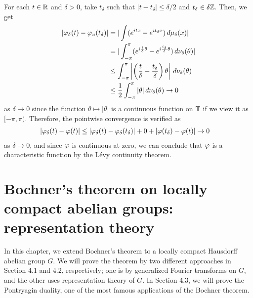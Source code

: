 \documentclass{../../small}
\begin{document}
\begin{pf}
For each $t\in\mathbb{R}$ and $\delta>0$, take $t_\delta$ such that $|t-t_\delta|\le\delta/2$ and $t_\delta\in\delta\mathbb{Z}$.
Then, we get
\begin{align*}
|\varphi_\delta(t)-\varphi_u(t_\delta)|
&=|\int(e^{itx}-e^{it_\delta x})\,d\mu_\delta(x)|\\
&=|\int_{-\pi}^\pi(e^{i\frac t\delta\theta}-e^{i\frac{t_\delta}\delta\theta})\,d\nu_\delta(\theta)|\\
&\le\int_{-\pi}^\pi\left|\left(\frac t\delta-\frac{t_\delta}\delta\right)\theta\right|\,d\nu_\delta(\theta)\\
&\le\frac12\int_{-\pi}^\pi|\theta|\,d\nu_\delta(\theta)\to0
\end{align*}
as $\delta\to0$ since the function $\theta\mapsto|\theta|$ is a continuous function on $\mathbb{T}$ if we view it as $[-\pi,\pi)$.
Therefore, the pointwise convergence is verified as
\begin{align*}
|\varphi_\delta(t)-\varphi(t)|&\le|\varphi_\delta(t)-\varphi_\delta(t_\delta)|+0+|\varphi(t_\delta)-\varphi(t)|\to0
\end{align*}
as $\delta\to0$, and since $\varphi$ is continuous at zero, we can conclude that $\varphi$ is a characteristic function by the L\'evy continuity theorem.
\end{pf}



\iffalse
\subsection{Notes on non-locally compact groups}
bochner
measure <=> pos def continuous

schwarts bochner (finite condition removed)
tempered measure <=> pos def tempered dist


on hilbert space
measure <=> pos def continuous + trace class
\fi









\newpage
\section{Bochner's theorem on locally compact abelian groups: representation theory}

In this chapter, we extend Bochner's theorem to a locally compact Hausdorff abelian group $G$.
We will prove the theorem by two different approaches in Section 4.1 and 4.2, respectively; one is by generalized Fourier transforms on $G$, and the other uses representation theory of $G$.
In Section 4.3, we will prove the Pontryagin duality, one of the most famous applications of the Bochner theorem.
\end{document}
